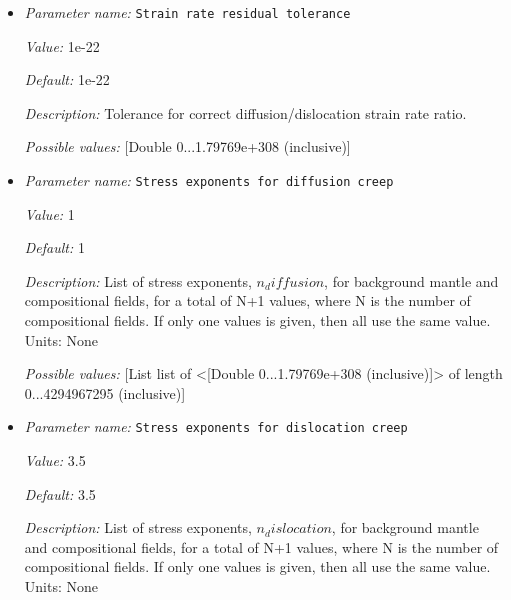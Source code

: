 \begin{itemize}
{\it Default:} 1e22


{\it Description:} Reference viscosity for nondimensionalization. Units $Pa s$


{\it Possible values:} [Double 0...1.79769e+308 (inclusive)]
\item {\it Parameter name:} {\tt Strain rate residual tolerance}
\label{parameters:Material model/Diffusion dislocation/Strain rate residual tolerance}


{\it Value:} 1e-22


{\it Default:} 1e-22


{\it Description:} Tolerance for correct diffusion/dislocation strain rate ratio.


{\it Possible values:} [Double 0...1.79769e+308 (inclusive)]
\item {\it Parameter name:} {\tt Stress exponents for diffusion creep}
\label{parameters:Material model/Diffusion dislocation/Stress exponents for diffusion creep}


{\it Value:} 1


{\it Default:} 1


{\it Description:} List of stress exponents, $n_diffusion$, for background mantle and compositional fields, for a total of N+1 values, where N is the number of compositional fields. If only one values is given, then all use the same value.  Units: None


{\it Possible values:} [List list of <[Double 0...1.79769e+308 (inclusive)]> of length 0...4294967295 (inclusive)]
\item {\it Parameter name:} {\tt Stress exponents for dislocation creep}
\label{parameters:Material model/Diffusion dislocation/Stress exponents for dislocation creep}


{\it Value:} 3.5


{\it Default:} 3.5


{\it Description:} List of stress exponents, $n_dislocation$, for background mantle and compositional fields, for a total of N+1 values, where N is the number of compositional fields. If only one values is given, then all use the same value.  Units: None



\end{itemize}
